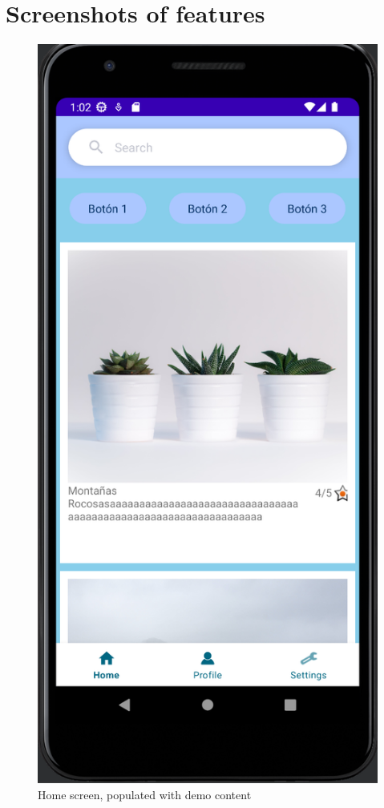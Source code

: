 \section{Screenshots of features}

\begin{figure}
	\centering
	\includegraphics[width=.7\linewidth]{figures/home_dummy.png}
	\caption{Home screen, populated with demo content}
	\label{fig_home_screen}
\end{figure}

